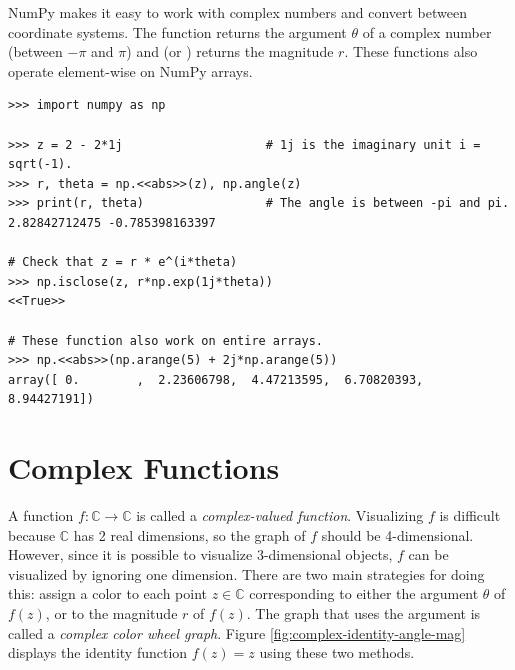 NumPy makes it easy to work with complex numbers and convert between coordinate systems.
The function  returns the argument $\theta$ of a complex number (between $-\pi$ and $\pi$) and  (or ) returns the magnitude $r$.
These functions also operate element-wise on NumPy arrays.

\begin{lstlisting}
>>> import numpy as np

>>> z = 2 - 2*1j                    # 1j is the imaginary unit i = sqrt(-1).
>>> r, theta = np.<<abs>>(z), np.angle(z)
>>> print(r, theta)                 # The angle is between -pi and pi.
2.82842712475 -0.785398163397

# Check that z = r * e^(i*theta)
>>> np.isclose(z, r*np.exp(1j*theta))
<<True>>

# These function also work on entire arrays.
>>> np.<<abs>>(np.arange(5) + 2j*np.arange(5))
array([ 0.        ,  2.23606798,  4.47213595,  6.70820393,  8.94427191])
\end{lstlisting}

\section*{Complex Functions} %

A function $f: \mathbb{C} \rightarrow \mathbb{C}$ is called a \emph{complex-valued function}.
Visualizing $f$ is difficult because $\mathbb{C}$ has 2 real dimensions, so the graph of $f$ should be 4-dimensional.
However, since it is possible to visualize 3-dimensional objects, $f$ can be visualized by ignoring one dimension.
There are two main strategies for doing this: assign a color to each point $z\in\mathbb{C}$ corresponding to either the argument $\theta$ of $f(z)$, or to the magnitude $r$ of $f(z)$.
The graph that uses the argument is called a \emph{complex color wheel graph}.
Figure \ref{fig:complex-identity-angle-mag} displays the identity function $f(z) = z$ using these two methods.

